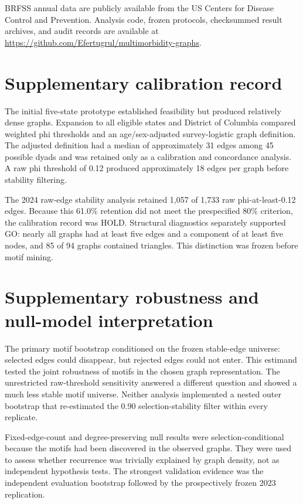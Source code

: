 \documentclass[11pt]{article}
\newcommand{\brfss}{\textsc{BRFSS}}
\begin{document}
\brfss{} annual data are publicly available from the US Centers for Disease
Control and Prevention. Analysis code, frozen protocols, checksummed result
archives, and audit records are available at
\url{https://github.com/Efertugrul/multimorbidity-graphs}.

\appendix

\section{Supplementary calibration record}

The initial five-state prototype established feasibility but produced
relatively dense graphs. Expansion to all eligible states and District of
Columbia compared weighted phi thresholds and an age/sex-adjusted
survey-logistic graph definition. The adjusted definition had a median of
approximately 31 edges among 45 possible dyads and was retained only as a
calibration and concordance analysis. A raw phi threshold of 0.12 produced
approximately 18 edges per graph before stability filtering.

The 2024 raw-edge stability analysis retained 1,057 of 1,733 raw
phi-at-least-0.12 edges. Because this 61.0\% retention did not meet the
prespecified 80\% criterion, the calibration record was \textsc{HOLD}.
Structural diagnostics separately supported \textsc{GO}: nearly all graphs
had at least five edges and a component of at least five nodes, and 85 of 94
graphs contained triangles. This distinction was frozen before motif mining.

\section{Supplementary robustness and null-model interpretation}

The primary motif bootstrap conditioned on the frozen stable-edge universe:
selected edges could disappear, but rejected edges could not enter. This
estimand tested the joint robustness of motifs in the chosen graph
representation. The unrestricted raw-threshold sensitivity answered a
different question and showed a much less stable motif universe. Neither
analysis implemented a nested outer bootstrap that re-estimated the 0.90
selection-stability filter within every replicate.

Fixed-edge-count and degree-preserving null results were selection-conditional
because the motifs had been discovered in the observed graphs. They were used
to assess whether recurrence was trivially explained by graph density, not as
independent hypothesis tests. The strongest validation evidence was the
independent evaluation bootstrap followed by the prospectively frozen 2023
replication.
\end{document}
